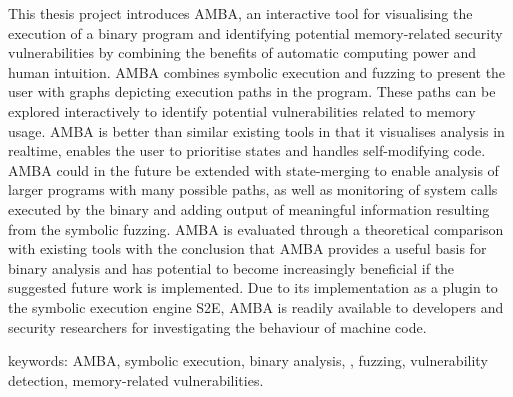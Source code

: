 This thesis project introduces AMBA, an interactive tool for
visualising the execution of a binary program and identifying
potential memory-related security vulnerabilities by combining the
benefits of automatic computing power and human intuition. AMBA
combines symbolic execution and fuzzing to present the user with
graphs depicting execution paths in the program. These paths can be
explored interactively to identify potential vulnerabilities related
to memory usage. AMBA is better than similar existing tools in that it
visualises analysis in realtime, enables the user to prioritise states
and handles self-modifying code. AMBA could in the future be extended
with state-merging to enable analysis of larger programs with many
possible paths, as well as monitoring of system calls executed by the
binary and adding output of meaningful information resulting from the
symbolic fuzzing. AMBA is evaluated through a theoretical comparison
with existing tools with the conclusion that AMBA provides a useful
basis for binary analysis and has potential to become increasingly
beneficial if the suggested future work is implemented. Due to its
implementation as a plugin to the symbolic execution engine S2E, AMBA
is readily available to developers and security researchers for
investigating the behaviour of machine code.


keywords: AMBA, symbolic execution, binary analysis, \stoe{},
fuzzing, vulnerability detection, memory-related vulnerabilities.
